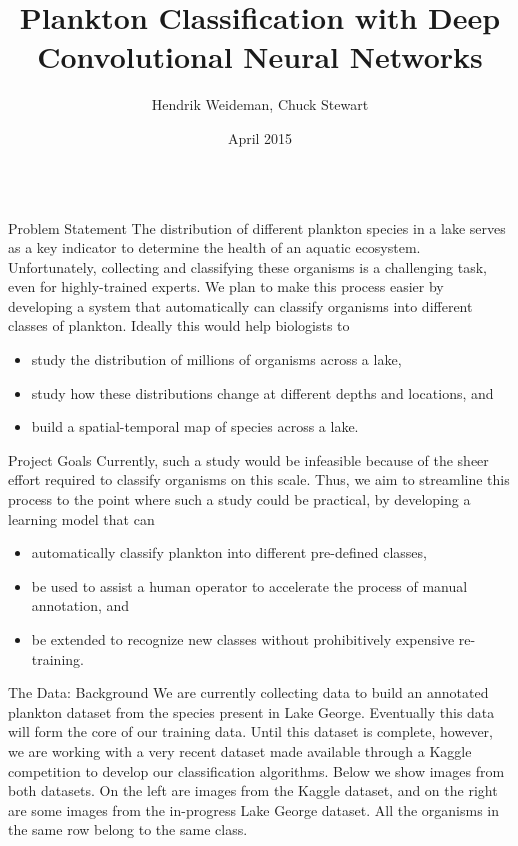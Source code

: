 \documentclass[final,hyperref={pdfpagelabels=false}]{beamer}
\title{\huge Plankton Classification with Deep Convolutional Neural Networks}
\author{Hendrik Weideman, Chuck Stewart}
\institute{Department of Computer Science\\Rensselaer Polytechnic Institute}
\date[April 2015]{April 2015}
\begin{document}
\begin{frame}
  \begin{columns}[T]
  	\begin{column}{.32\textwidth}
      \begin{block}{Problem Statement}
        The distribution of different plankton species in a lake serves as a key indicator to determine the health of an aquatic
        ecosystem.  Unfortunately, collecting and classifying these organisms is a challenging task, even for highly-trained
        experts.
        We plan to make this process easier by developing a system that automatically can classify organisms into different classes of
        plankton.  Ideally this would help biologists to
        \begin{itemize}
          \item study the distribution of millions of organisms across a lake,
          \item study how these distributions change at different depths and locations, and
          \item build a spatial-temporal map of species across a lake.
        \end{itemize}
      \end{block}

      \begin{block}{Project Goals}
        Currently, such a study would be infeasible because of the sheer effort required to classify organisms on this scale.
        Thus, we aim to streamline this process to the point where such a study could be practical, by developing a learning model
        that can
        \begin{itemize}
          \item automatically classify plankton into different pre-defined classes,
          \item be used to assist a human operator to accelerate the process of manual annotation, and
          \item be extended to recognize new classes without prohibitively expensive re-training.
        \end{itemize}
      \end{block}

      \begin{block}{The Data: Background}
        We are currently collecting data to build an annotated plankton dataset from the species present in Lake George. 
        Eventually this data
        will form the core of our training data.  Until this dataset is complete, however, we are working with a very recent dataset
        made available through a Kaggle competition to develop our classification algorithms.  Below we show images from both datasets.
        On the left are images from the Kaggle dataset, and on the right are some images from the in-progress Lake George dataset.
        All the organisms in the same row belong to the same class.


\end{block}
\end{column}
\end{columns}
\end{frame}
\end{document}
